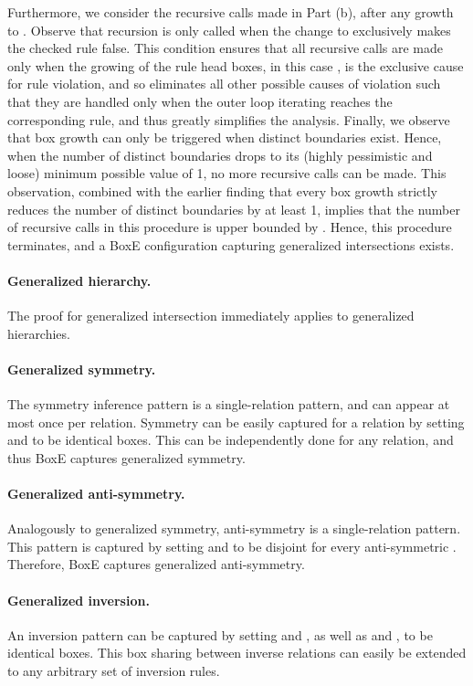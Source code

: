 \documentclass{article}
\begin{document}
Furthermore, we consider the recursive calls made in Part (b), after any growth to . Observe that recursion is only called when the change to  exclusively makes the checked rule false. This condition ensures that all recursive calls are made only when the growing of the rule head boxes, in this case , is the exclusive cause for rule violation, and so eliminates all other possible causes of violation such that they are handled only when the outer loop iterating reaches the corresponding rule, and thus greatly simplifies the analysis. Finally, we observe that box growth can only be triggered when distinct boundaries exist. Hence, when the number of distinct boundaries drops to its (highly pessimistic and loose) minimum possible value of 1, no more recursive calls can be made. This observation, combined with the earlier finding that every box growth strictly reduces the number of distinct boundaries by at least 1, implies that the number of recursive calls in this procedure is upper bounded by . Hence, this procedure terminates, and a BoxE configuration capturing generalized intersections exists. 


\paragraph{Generalized hierarchy.} The proof for generalized intersection immediately applies to generalized hierarchies. 

\paragraph{Generalized symmetry.} The symmetry inference pattern is a single-relation pattern, and can appear at most once per relation. Symmetry can be easily captured for a relation  by setting  and  to be identical boxes. This can be independently done for any relation, and thus BoxE captures generalized symmetry. 

\paragraph{Generalized anti-symmetry.} Analogously to generalized symmetry, anti-symmetry is a single-relation pattern. This pattern is captured by setting  and  to be disjoint for every anti-symmetric . Therefore, BoxE captures generalized anti-symmetry.

\paragraph{Generalized inversion.} An inversion pattern  can be captured by setting  and , as well as  and , to be identical boxes. This box sharing between inverse relations can easily be extended to any arbitrary set of inversion rules. 
\end{document}
